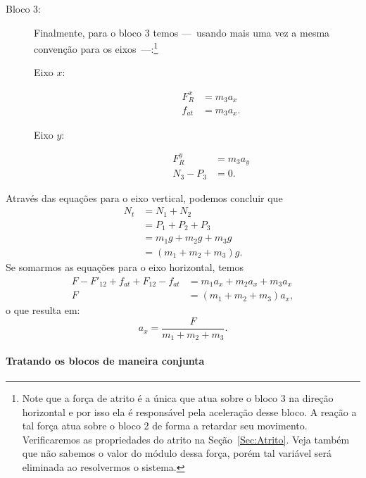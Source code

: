 \begin{description}
    \item[Bloco 3:] Finalmente, para o bloco 3 temos ---~usando mais uma vez a mesma convenção para os eixos~---:\footnote{Note que a força de atrito é a única que atua sobre o bloco 3 na direção horizontal e por isso ela é responsável pela aceleração desse bloco. A reação a tal força atua sobre o bloco 2 de forma a retardar seu movimento. Verificaremos as propriedades do atrito na Seção~\ref{Sec:Atrito}. Veja também que não sabemos o valor do módulo dessa força, porém tal variável será eliminada ao resolvermos o sistema.}
        \begin{description}
            \item[Eixo $x$:]
                \begin{align}
                    F_R^x &= m_3 a_x \\
                    f_{at} &= m_3 a_x. \label{Eq:DiscForcasInternasBl2X}
                \end{align}
            \item[Eixo $y$:]
                \begin{align}
                    F_R^y &= m_3 a_y \\
                    N_3 - P_3 &= 0.
                \end{align}
        \end{description}
\end{description}

\noindent{}Através das equações para o eixo vertical, podemos concluir que
\begin{align}
    N_t &= N_1 + N_2 \\
    &= P_1 + P_2 + P_3\\
    &= m_1g + m_2g + m_3g\\
    &= (m_1 + m_2 + m_3)g.
\end{align}
%
Se somarmos as equações para o eixo horizontal, temos
\begin{align}
    F - F'_{12} + f_{at} + F_{12} - f_{at} &= m_1 a_x + m_2 a_x + m_3 a_x \\
    F &= (m_1 + m_2 + m_3) a_x,
\end{align}
%
o que resulta em:
\begin{equation}
    a_x = \frac{F}{m_1 + m_2 + m_3}.
\end{equation}

\paragraph{Tratando os blocos de maneira conjunta}

